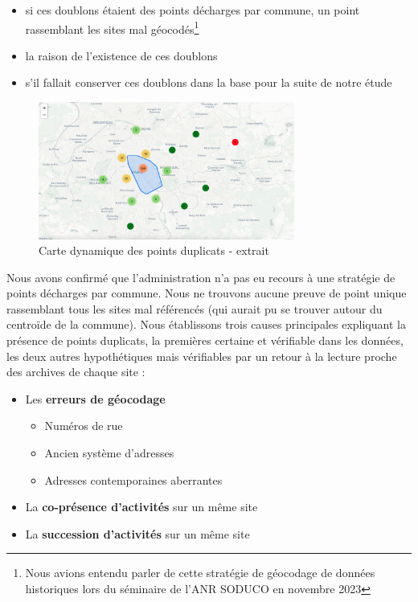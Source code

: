 \documentclass[a4paper,twoside,12pt]{book}
\begin{document}
\begin{itemize}[label ={\textbf{\textbullet}}]
\item si ces doublons étaient des points \og{} décharges \fg{} par commune, un point rassemblant les sites mal géocodés\footnote{Nous avions entendu parler de cette stratégie de géocodage de données historiques lors du séminaire de l'ANR SODUCO en novembre 2023} 
\item la raison de l'existence de ces doublons
\item s'il fallait conserver ces doublons dans la base pour la suite de notre étude 
\end{itemize}

\begin{figure}[!h]
\centering 
\includegraphics[width=0.75\textwidth]{img/chapitre3/CASIAS_Carte_duplicats_ZoomParis.png}
\caption{Carte dynamique des points duplicats - extrait}
\label{fig:duplicatszoomparis}
\end{figure}

Nous avons confirmé que l'administration n'a pas eu recours à une stratégie de points décharges par commune. Nous ne trouvons aucune preuve de point unique rassemblant tous les sites mal référencés (qui aurait pu se trouver autour du centroïde de la commune). Nous établissons trois causes principales expliquant la présence de points duplicats, la premières certaine et vérifiable dans les données, les deux autres hypothétiques mais vérifiables par un retour à la lecture proche des archives de chaque site :

\begin{itemize}[label ={\textbf{\textbullet}}]
	\item Les \textbf{erreurs de géocodage} 
	\begin{itemize}[label={\color{black}$\circ$}]
		\item Numéros de rue
		\item Ancien système d'adresses
		\item Adresses contemporaines aberrantes
	\end{itemize}
	\item La \textbf{co-présence d'activités} sur un même site
	\item La \textbf{succession d'activités} sur un même site 
\end{itemize}
\end{document}
